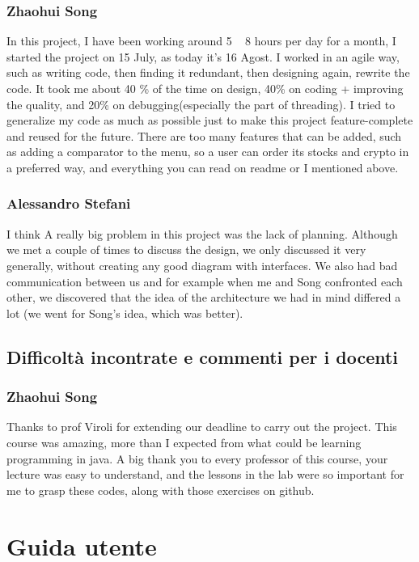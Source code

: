 \documentclass[a4paper,12pt]{report}
\begin{document}
\subsection*{Zhaohui Song}
In this project, I have been working around 5 ~ 8 hours per day for a month, I started the project on 15 July,  as today it's 16 Agost.
%
I worked in an agile way, such as writing code, then finding it redundant, then designing again, rewrite the code. 
%
It took me about 40 \% of the time on design, 40\% on coding + improving the quality, and 20\% on debugging(especially the part of threading). 
%
I tried to generalize my code as much as possible just to make this project feature-complete and reused for the future. 
%
There are too many features that can be added, such as adding a comparator to the menu, so a user can order its stocks and crypto in a preferred way, and everything you can read on readme or I mentioned above.  

\subsection*{Alessandro Stefani}
I think A really big problem in this project was the lack of planning. Although we met a couple of times to discuss the design, we only discussed it very generally, without creating any good diagram with interfaces. We also had bad communication between us and for example when me and Song confronted each other, we discovered that the idea of the architecture we had in mind differed a lot (we went for Song's idea, which was better).

\section{Difficoltà incontrate e commenti per i docenti}
\subsection*{Zhaohui Song}
Thanks to prof Viroli for extending our deadline to carry out the project.
%
This course was amazing, more than I expected from what could be learning programming in java. 
%
A big thank you to every professor of this course, your lecture was easy to understand, and the lessons in the lab were so important for me to grasp these codes, along with those exercises on github.

\appendix
\chapter{Guida utente}
\end{document}
